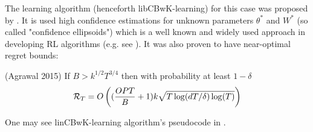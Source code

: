 The learning algorithm (henceforth libCBwK-learning) for this case was proposed by \cite{Agrawal2015}. It is used high confidence estimations for unknown parameters $\theta^*$ and $W^*$ (so called "confidence ellipsoids") which is a well known and widely used approach in developing RL algorithms (e.g. see \cite{Auer2003}). It was also proven to have near-optimal regret bounds:

\begin{theorem} (Agrawal 2015) If $B > k^{1/2}T^{3/4}$ then with probability at least $1-\delta$ 
\[
    \operatorname{\mathcal{R}}_T = O\left((\frac{OPT}{B} + 1)k\sqrt{T\log(dT/\delta)\log(T)}\right)
\]       
\end{theorem}

One may see linCBwK-learning algorithm's pseudocode in \cite{Agrawal2015}.